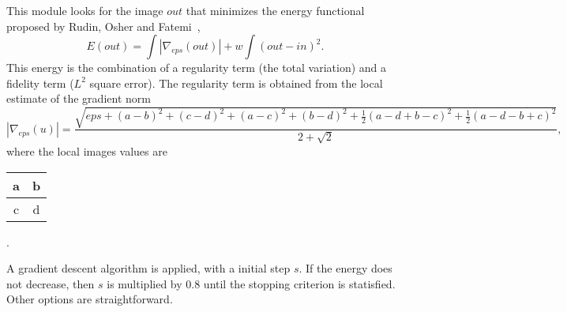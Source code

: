 This module looks for the image $out$ that minimizes the energy
functional proposed by Rudin, Osher and 
Fatemi~\cite{rudin.osher.ea:nonlinear}\cite{rudin.osher:total},
$$E(out) = \int |\nabla_{eps}(out)| +  w \int (out -in)^2.$$
This energy is the combination of a regularity term (the total variation)
and a fidelity term ($L^2$ square error). 
The regularity term is obtained from the local estimate of the gradient norm
$$|\nabla_{eps}(u)| = \frac{\displaystyle
\sqrt{eps + (a-b)^2+(c-d)^2+(a-c)^2+(b-d)^2 
+ \frac 12 (a-d+b-c)^2 
+ \frac 12 (a-d-b+c)^2}}
{2+\sqrt{2}},$$
where the local images values are 
\begin{tabular}{|c|c|}
\hline
a & b \\
\hline
c & d \\
\hline
\end{tabular}.

A gradient descent algorithm is applied, with a initial step $s$.
If the energy does not decrease, then $s$ is multiplied by
$0.8$ until the stopping criterion is statisfied. 
Other options are straightforward.
